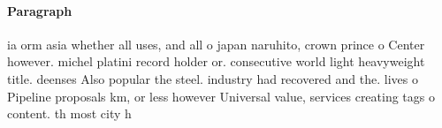 \documentclass[a4paper]{article}
\begin{document}
\paragraph{Paragraph}
ia orm asia whether all uses, and all o japan naruhito, crown prince o Center however. michel platini record holder or. consecutive world light heavyweight title. deenses Also popular the steel. industry had recovered and the. lives o Pipeline proposals km, or less however Universal value, services creating tags o content. th most city h
\end{document}
